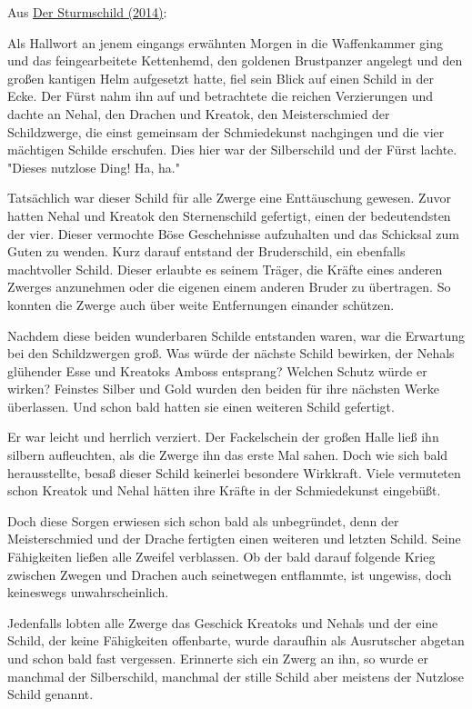 \documentclass[10pt, a4paper, oneside]{book}
\newcommand{\refstorytext}[1]{\hyperref[Storytext: #1]{#1}}
\begin{document}
\begin{multicols}{2}
\begin{center}
    Aus \refstorytext{Der Sturmschild (2014)}:
\end{center}

Als Hallwort an jenem eingangs erwähnten Morgen in die Waffenkammer ging und das feingearbeitete Kettenhemd, den goldenen Brustpanzer angelegt und den großen kantigen Helm aufgesetzt hatte, fiel sein Blick auf einen Schild in der Ecke. Der Fürst nahm ihn auf und betrachtete die reichen Verzierungen und dachte an Nehal, den Drachen und Kreatok, den Meisterschmied der Schildzwerge, die einst gemeinsam der Schmiedekunst nachgingen und die vier mächtigen Schilde erschufen. Dies hier war der Silberschild und der Fürst lachte. "Dieses nutzlose Ding! Ha, ha."\bigskip

Tatsächlich war dieser Schild für alle Zwerge eine Enttäuschung gewesen. Zuvor hatten Nehal und Kreatok den Sternenschild gefertigt, einen der  bedeutendsten der vier. Dieser vermochte Böse Geschehnisse aufzuhalten  und das Schicksal zum Guten zu wenden. Kurz darauf entstand der Bruderschild, ein ebenfalls machtvoller Schild.  Dieser erlaubte es seinem Träger, die Kräfte eines anderen Zwerges anzunehmen oder die eigenen einem anderen Bruder zu übertragen. So konnten die Zwerge auch über weite Entfernungen einander schützen.\bigskip

Nachdem diese beiden wunderbaren Schilde entstanden waren, war die Erwartung bei den Schildzwergen groß. Was würde der nächste Schild bewirken, der Nehals glühender Esse und Kreatoks Amboss entsprang? Welchen Schutz würde er wirken? Feinstes Silber und Gold wurden den beiden für ihre nächsten Werke überlassen. Und schon bald hatten sie einen weiteren Schild gefertigt.

Er war leicht und herrlich verziert. Der Fackelschein der großen Halle ließ ihn silbern aufleuchten, als die Zwerge ihn das erste Mal sahen. Doch wie sich bald herausstellte, besaß dieser Schild keinerlei besondere Wirkkraft. Viele vermuteten schon Kreatok und Nehal hätten ihre Kräfte in der Schmiedekunst eingebüßt.\bigskip

Doch diese Sorgen erwiesen sich schon bald als unbegründet, denn der Meisterschmied und der Drache fertigten einen weiteren und letzten Schild. Seine Fähigkeiten ließen alle Zweifel verblassen. Ob der bald darauf folgende Krieg zwischen Zwegen und Drachen auch seinetwegen entflammte, ist ungewiss, doch keineswegs unwahrscheinlich.

Jedenfalls lobten alle Zwerge das Geschick Kreatoks und Nehals und der eine Schild, der keine Fähigkeiten offenbarte, wurde daraufhin als Ausrutscher abgetan und schon bald fast vergessen. Erinnerte sich ein Zwerg an ihn, so wurde er manchmal der Silberschild, manchmal der stille Schild aber meistens der Nutzlose Schild genannt.\bigskip


\end{multicols}
\end{document}
